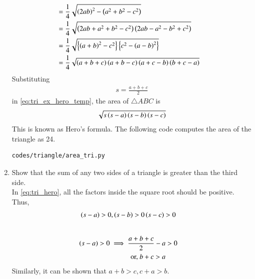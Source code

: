 \begin{enumerate}[label=\arabic*.,ref=\thesubsection.\theenumi]
{\begin{align}
{}
\\
&=\frac{1}{4}\sqrt{\left(2ab\right)^2-\left(a^2+b^2-c^2\right)}
\\
&=\frac{1}{4}\sqrt{\left(2ab+a^2+b^2-c^2\right)\left(2ab-a^2-b^2+c^2\right)}
\\
&= \frac{1}{4}\sqrt{\left\{\left(a+b\right)^2-c^2\right\}\left\{c^2-\left(a-b\right)^2\right\}}
\\
&= \frac{1}{4}\sqrt{\left(a+b+c\right)\left(a+b-c\right)\left(a+c-b\right)\left(b+c-a\right)}
\label{eq:tri_ex_hero_temp}
\end{align}
}
Substituting 
%
\begin{align}
s=\frac{a+b+c}{2}
\end{align}
%
in \eqref{eq:tri_ex_hero_temp}, the area of $\triangle ABC$ is 
%
\begin{align}
\label{eq:tri_hero}
\sqrt{s\left(s-a\right)\left(s-b\right)\left(s-c\right)}
\end{align}
%
This is known as Hero's formula.  The following code computes the area of the  triangle as 24.
%
\begin{lstlisting}
codes/triangle/area_tri.py
\end{lstlisting}
%
\item Show that the sum of any two sides of a triangle is greater than the third side.
\\
\solution In \eqref{eq:tri_hero}, all the factors inside the square root should be positive.  Thus, 
%
\begin{align}
\left(s-a\right) > 0, \left(s-b\right) > 0\left(s-c\right) &> 0
\end{align}
%
\begin{align}
\\
\left(s-a\right) > 0 \implies \frac{a+b+c}{2} -a &> 0
\\
\text{or, } b+c > a
\end{align}
%
Similarly, it can be shown that $a+b>c, c+a>b$.


\end{enumerate}
